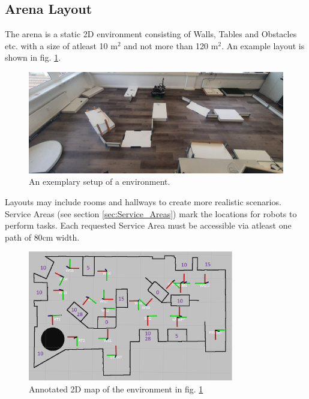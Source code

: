 \subsection{Arena Layout}
\label{ssec:ArenaGeneral}

The arena is a static 2D environment consisting of Walls, Tables and Obstacles etc. with a size of atleast 10 m$^2$ and not more than 120 m$^2$. 
An example layout is shown in fig. \ref{fig:arena_example}.

\begin{figure} [h!]
	\centering
	\includegraphics[width= 1\textwidth ]{./images/general_rules/arena_example.jpg}
	\caption{An exemplary setup of a \RCAW environment.}
	\label{fig:arena_example}
\end{figure}

Layouts may include rooms and hallways to create more realistic scenarios.
Service Areas (see section \ref{sec:Service_Areas}) mark the locations for robots to perform tasks.
Each requested Service Area must be accessible via atleast one path of $80\si{\centi\meter}$ width.

\begin{figure} [h!]
	\centering
	\includegraphics[width= 0.8\textwidth ]{./images/general_rules/arena_map_annotated}
	\caption{Annotated 2D map of the environment in fig. \ref{fig:arena_example}}
	\label{fig:arena_map_annotated}
\end{figure}

